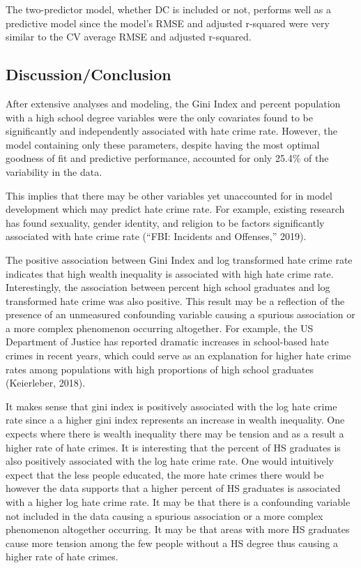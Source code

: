 \documentclass[
]{article}
\begin{document}
The two-predictor model, whether DC is included or not, performs well as
a predictive model since the model's RMSE and adjusted r-squared were
very similar to the CV average RMSE and adjusted r-squared.

\hypertarget{discussionconclusion}{%
\subsection{Discussion/Conclusion}\label{discussionconclusion}}

After extensive analyses and modeling, the Gini Index and percent
population with a high school degree variables were the only covariates
found to be significantly and independently associated with hate crime
rate. However, the model containing only these parameters, despite
having the most optimal goodness of fit and predictive performance,
accounted for only 25.4\% of the variability in the data.

This implies that there may be other variables yet unaccounted for in
model development which may predict hate crime rate. For example,
existing research has found sexuality, gender identity, and religion to
be factors significantly associated with hate crime rate (``FBI:
Incidents and Offenses,'' 2019).

The positive association between Gini Index and log transformed hate
crime rate indicates that high wealth inequality is associated with high
hate crime rate. Interestingly, the association between percent high
school graduates and log transformed hate crime was also positive. This
result may be a reflection of the presence of an unmeasured confounding
variable causing a spurious association or a more complex phenomenon
occurring altogether. For example, the US Department of Justice has
reported dramatic increases in school-based hate crimes in recent years,
which could serve as an explanation for higher hate crime rates among
populations with high proportions of high school graduates (Keierleber,
2018).

It makes sense that gini index is positively associated with the log
hate crime rate since a a higher gini index represents an increase in
wealth inequality. One expects where there is wealth inequality there
may be tension and as a result a higher rate of hate crimes. It is
interesting that the percent of HS graduates is also positively
associated with the log hate crime rate. One would intuitively expect
that the less people educated, the more hate crimes there would be
however the data supports that a higher percent of HS graduates is
associated with a higher log hate crime rate. It may be that there is a
confounding variable not included in the data causing a spurious
association or a more complex phenomenon altogether occurring. It may be
that areas with more HS graduates cause more tension among the few
people without a HS degree thus causing a higher rate of hate crimes.
\end{document}
